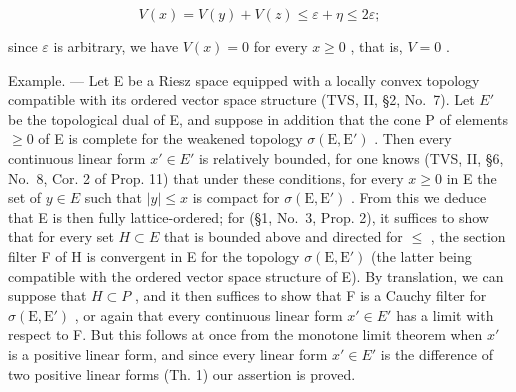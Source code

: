 \[
V (x) = V (y) + V (z) \leqslant \varepsilon + \eta \leqslant 2 \varepsilon ;
\]

since \(\varepsilon\) is arbitrary, we have \(V(x) = 0\) for every \(x \geqslant 0\) , that is, \(V = 0\) .

Example. --- Let E be a Riesz space equipped with a locally convex topology compatible with its ordered vector space structure (TVS, II, §2, No.~7). Let \(E'\) be the topological dual of E, and suppose in addition that the cone P of elements \(\geqslant 0\) of E is complete for the weakened topology \(\sigma(\mathrm{E},\mathrm{E}')\) . Then every continuous linear form \(x' \in E'\) is relatively bounded, for one knows (TVS, II, §6, No.~8, Cor. 2 of Prop. 11) that under these conditions, for every \(x \geqslant 0\) in E the set of \(y \in E\) such that \(|y| \leqslant x\) is compact for \(\sigma(\mathrm{E},\mathrm{E}')\) . From this we deduce that E is then fully lattice-ordered; for (§1, No.~3, Prop. 2), it suffices to show that for every set \(H \subset E\) that is bounded above and directed for \(\leqslant\) , the section filter F of H is convergent in E for the topology \(\sigma(\mathrm{E},\mathrm{E}')\) (the latter being compatible with the ordered vector space structure of E). By translation, we can suppose that \(H \subset P\) , and it then suffices to show that F is a Cauchy filter for \(\sigma(\mathrm{E},\mathrm{E}')\) , or again that every continuous linear form \(x' \in E'\) has a limit with respect to F. But this follows at once from the monotone limit theorem when \(x'\) is a positive linear form, and since every linear form \(x' \in E'\) is the difference of two positive linear forms (Th. 1) our assertion is proved.
\relax{}
